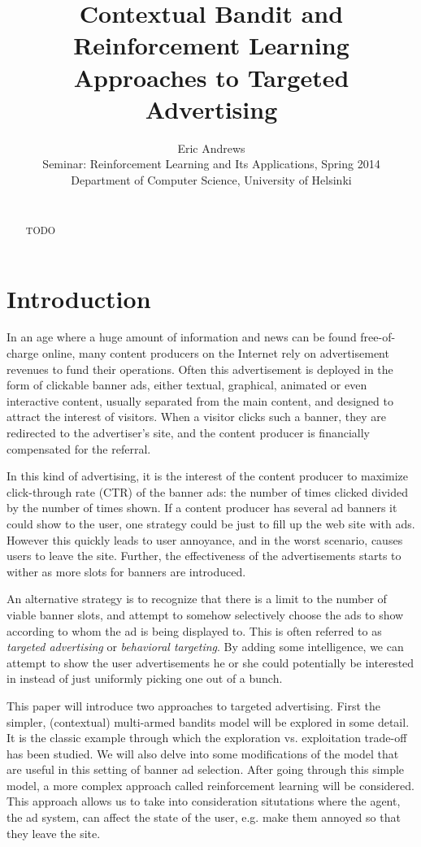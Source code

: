 \documentclass{article} %
\title{Contextual Bandit and Reinforcement Learning Approaches to Targeted
Advertising}
\author{
Eric Andrews \\
Seminar: Reinforcement Learning and Its Applications, Spring 2014 \\
Department of Computer Science, University of Helsinki\\\\
}
\begin{document}
\maketitle

\begin{abstract}
  TODO
\end{abstract}

\section{Introduction}

In an age where a huge amount of information and news can be found
free-of-charge online, many content producers on the Internet rely on
advertisement revenues to fund their operations. Often this advertisement is
deployed in the form of clickable banner ads, either textual, graphical,
animated or even interactive content, usually separated from the main content,
and designed to attract the interest of visitors. When a visitor clicks such a
banner, they are redirected to the advertiser's site, and the content producer
is financially compensated for the referral.

In this kind of advertising, it is the interest of the content producer to
maximize click-through rate (CTR) of the banner ads: the number of times
clicked divided by the number of times shown. If a content producer has several
ad banners it could show to the user, one strategy could be just to fill up the
web site with ads. However this quickly leads to user annoyance, and in the
worst scenario, causes users to leave the site. Further, the effectiveness of
the advertisements starts to wither as more slots for banners are introduced.

An alternative strategy is to recognize that there is a limit to the number of
viable banner slots, and attempt to somehow selectively choose the ads to show
according to whom the ad is being displayed to. This is often referred to as
\emph{targeted advertising} or \emph{behavioral targeting}. By adding some
intelligence, we can attempt to show the user advertisements he or she could
potentially be interested in instead of just uniformly picking one out of a
bunch.



This paper will introduce two approaches to targeted advertising. First the
simpler, (contextual) multi-armed bandits model will be explored in some
detail. It is the classic example through which the exploration vs.
exploitation trade-off has been studied. We will also delve into some
modifications of the model that are useful in this setting of banner ad
selection. After going through this simple model, a more complex approach
called reinforcement learning will be considered. This approach allows us to
take into consideration situtations where the agent, the ad system, can affect
the state of the user, e.g. make them annoyed so that they leave the site.
\end{document}
